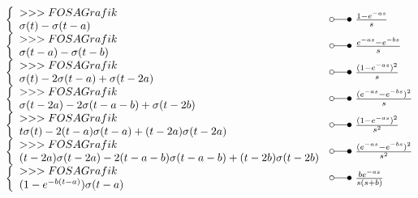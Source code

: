 \[ \begin{array}{@{}l@{ ~ \laplace ~ }l@{}}
\left\lbrace\begin{array}{l}
>>>FOSA Grafik \\
\sigma(t) - \sigma(t - a) \\
\end{array}\right. &
    \frac{1 - e^{-as}}{s} \\
\left\lbrace\begin{array}{l}
>>>FOSA Grafik \\
\sigma(t - a) - \sigma(t - b) \\
\end{array}\right. &
    \frac{e^{-as} - e^{-bs}}{s} \\
\left\lbrace\begin{array}{l}
>>>FOSA Grafik \\
\sigma(t) - 2 \sigma(t - a) + \sigma(t - 2a) \\
\end{array}\right. &
    \frac{(1 - e^{-as})^2}{s} \\
\left\lbrace\begin{array}{l}
>>>FOSA Grafik \\
\sigma(t - 2a) - 2 \sigma(t - a - b) + \sigma(t - 2b) \\
\end{array}\right. &
    \frac{(e^{-as} - e^{-bs})^2}{s} \\
\left\lbrace\begin{array}{l}
>>>FOSA Grafik \\
t \sigma(t) - 2 (t - a) \sigma(t - a) + (t - 2a) \sigma(t - 2a) \\
\end{array}\right. &
    \frac{(1 - e^{-as})^2}{s^2} \\
\left\lbrace\begin{array}{l}
>>>FOSA Grafik \\
(t - 2a) \sigma(t - 2a) - 2 (t - a - b) \sigma(t - a - b) + (t - 2b) \sigma(t - 2b) \\
\end{array}\right. &
    \frac{(e^{-as} - e^{-bs})^2}{s^2} \\
\left\lbrace\begin{array}{l}
>>>FOSA Grafik \\
(1 - e^{-b(t - a)}) \sigma(t - a) \\
\end{array}\right. &
    \frac{b e^{-as}}{s (s + b)} \\

\end{array}\]
